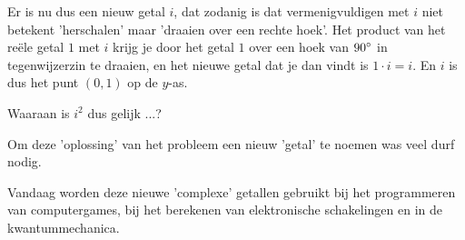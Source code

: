 \documentclass{ximera}
\begin{document}
\begin{image}[0.8\textwidth]
\end{image}



Er is nu dus een nieuw getal $i$, dat zodanig is dat vermenigvuldigen met $i$ niet betekent 'herschalen' maar 'draaien over een rechte hoek'.
Het product van het reële getal $1$ met $i$ krijg je door het getal $1$ over een hoek van $90^\circ$ in tegenwijzerzin te draaien, en het nieuwe getal dat je dan vindt is $1\cdot i=i$. 
En $i$ is dus het punt $(0,1)$ op de $y$-as. 

\begin{quickquestion*}{}
	Waaraan is $i^2$ dus gelijk ...?
\end{quickquestion*}

Om deze 'oplossing' van het probleem een nieuw 'getal' te noemen was veel durf nodig.



Vandaag worden deze nieuwe 'complexe' getallen gebruikt bij het programmeren van computergames, bij het berekenen van elektronische schakelingen en in de kwantummechanica.

\onlyOnline{
\end{expandable}
}




\end{document}
